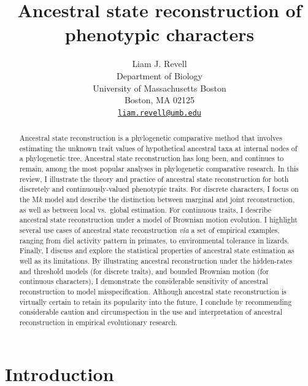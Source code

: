 \documentclass{article}
\title{Ancestral state reconstruction of phenotypic characters}
\author{
    Liam J. Revell
   \\
    Department of Biology \\
    University of Massachusetts Boston \\
  Boston, MA 02125 \\
  \texttt{\href{mailto:liam.revell@umb.edu}{\nolinkurl{liam.revell@umb.edu}}} \\
  }
\begin{document}
\maketitle


\begin{abstract}
Ancestral state reconstruction is a phylogenetic comparative method that involves estimating the unknown trait values of hypothetical ancestral taxa at internal nodes of a phylogenetic tree. Ancestral state reconstruction has long been, and continues to remain, among the most popular analyses in phylogenetic comparative research. In this review, I illustrate the theory and practice of ancestral state reconstruction for both discretely and continuously-valued phenotypic traits. For discrete characters, I focus on the M\emph{k} model and describe the distinction between marginal and joint reconstruction, as well as between local vs.~global estimation. For continuous traits, I describe ancestral state reconstruction under a model of Brownian motion evolution. I highlight several use cases of ancestral state reconstruction \emph{via} a set of empirical examples, ranging from diel activity pattern in primates, to environmental tolerance in lizards. Finally, I discuss and explore the statistical properties of ancestral state estimation as well as its limitations. By illustrating ancestral reconstruction under the hidden-rates and threshold models (for discrete traits), and bounded Brownian motion (for continuous characters), I demonstrate the considerable sensitivity of ancestral reconstruction to model misspecification. Although ancestral state reconstruction is virtually certain to retain its popularity into the future, I conclude by recommending considerable caution and circumspection in the use and interpretation of ancestral reconstruction in empirical evolutionary research.
\end{abstract}


\section{Introduction}\label{introduction}
\end{document}
